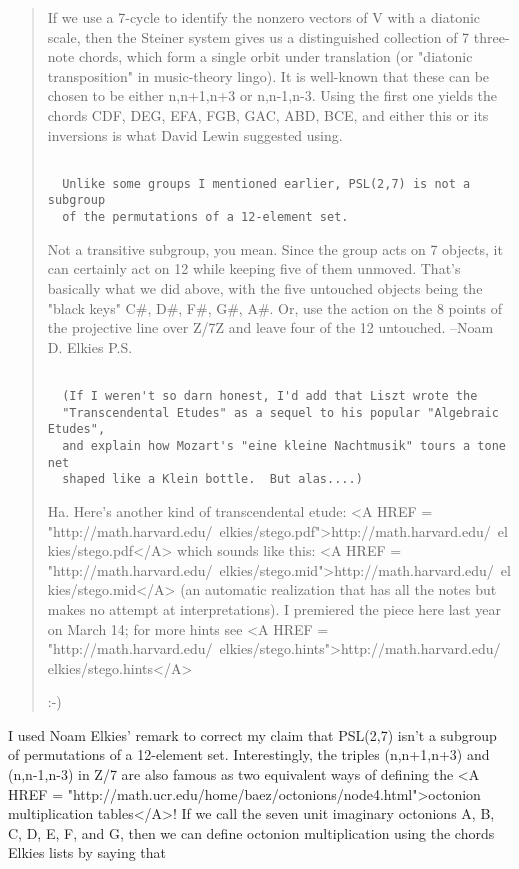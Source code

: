 \begin{quote}
If we use a 7-cycle to identify the nonzero vectors of V with
a diatonic scale, then the Steiner system gives us a distinguished
collection of 7 three-note chords, which form a single orbit under
translation (or "diatonic transposition" in music-theory lingo).
It is well-known that these can be chosen to be either {n,n+1,n+3}
or {n,n-1,n-3}.  Using the first one yields the chords
  {CDF}, {DEG}, {EFA}, {FGB}, {GAC}, {ABD}, {BCE},
and either this or its inversions is what David Lewin
suggested using.

\begin{verbatim}

  Unlike some groups I mentioned earlier, PSL(2,7) is not a subgroup
  of the permutations of a 12-element set.
\end{verbatim}
    
Not a transitive subgroup, you mean.  Since the group acts on 7 objects,
it can certainly act on 12 while keeping five of them unmoved.
That's basically what we did above, with the five untouched objects
being the "black keys" C#, D#, F#, G#, A#.  Or, use the action on
the 8 points of the projective line over Z/7Z and leave four of the 12
untouched.
--Noam D. Elkies
P.S.

\begin{verbatim}

  (If I weren't so darn honest, I'd add that Liszt wrote the
  "Transcendental Etudes" as a sequel to his popular "Algebraic Etudes",
  and explain how Mozart's "eine kleine Nachtmusik" tours a tone net
  shaped like a Klein bottle.  But alas....)
\end{verbatim}
    
Ha.  Here's another kind of transcendental etude:
  <A HREF = "http://math.harvard.edu/~elkies/stego.pdf">http://math.harvard.edu/~elkies/stego.pdf</A>
which sounds like this:
  <A HREF = "http://math.harvard.edu/~elkies/stego.mid">http://math.harvard.edu/~elkies/stego.mid</A>
(an automatic realization that has all the notes but makes
no attempt at interpretations).  I premiered the piece here
last year on March 14; for more hints see
  <A HREF = "http://math.harvard.edu/~elkies/stego.hints">http://math.harvard.edu/~elkies/stego.hints</A>

:-)
\end{quote}

I used Noam Elkies' remark to correct my claim that PSL(2,7) isn't a 
subgroup of permutations of a 12-element set.  Interestingly, the triples
(n,n+1,n+3) and (n,n-1,n-3) in Z/7 are also famous as two equivalent 
ways of defining the <A HREF = "http://math.ucr.edu/home/baez/octonions/node4.html">octonion multiplication tables</A>!
If we call the seven unit imaginary octonions A, B, C, D, E, F, and G,
then we can define octonion multiplication using the chords Elkies
lists by saying that

